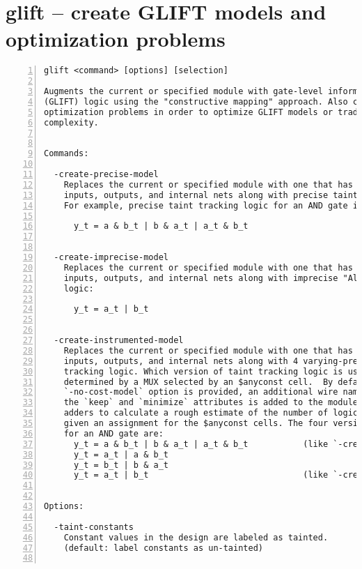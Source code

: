 \section{glift -- create GLIFT models and optimization problems}
\label{cmd:glift}
\begin{lstlisting}[numbers=left,frame=single]
    glift <command> [options] [selection]

Augments the current or specified module with gate-level information flow tracking
(GLIFT) logic using the "constructive mapping" approach. Also can set up QBF-SAT
optimization problems in order to optimize GLIFT models or trade off precision and
complexity.


Commands:

  -create-precise-model
    Replaces the current or specified module with one that has corresponding "taint"
    inputs, outputs, and internal nets along with precise taint tracking logic.
    For example, precise taint tracking logic for an AND gate is:

      y_t = a & b_t | b & a_t | a_t & b_t


  -create-imprecise-model
    Replaces the current or specified module with one that has corresponding "taint"
    inputs, outputs, and internal nets along with imprecise "All OR" taint tracking
    logic:

      y_t = a_t | b_t


  -create-instrumented-model
    Replaces the current or specified module with one that has corresponding "taint"
    inputs, outputs, and internal nets along with 4 varying-precision versions of taint
    tracking logic. Which version of taint tracking logic is used for a given gate is
    determined by a MUX selected by an $anyconst cell.  By default, unless the
    `-no-cost-model` option is provided, an additional wire named `__glift_weight` with
    the `keep` and `minimize` attributes is added to the module along with pmuxes and
    adders to calculate a rough estimate of the number of logic gates in the GLIFT model
    given an assignment for the $anyconst cells. The four versions of taint tracking logic
    for an AND gate are:
      y_t = a & b_t | b & a_t | a_t & b_t           (like `-create-precise-model`)
      y_t = a_t | a & b_t
      y_t = b_t | b & a_t
      y_t = a_t | b_t                               (like `-create-imprecise-model`)


Options:

  -taint-constants
    Constant values in the design are labeled as tainted.
    (default: label constants as un-tainted)


\end{lstlisting}
